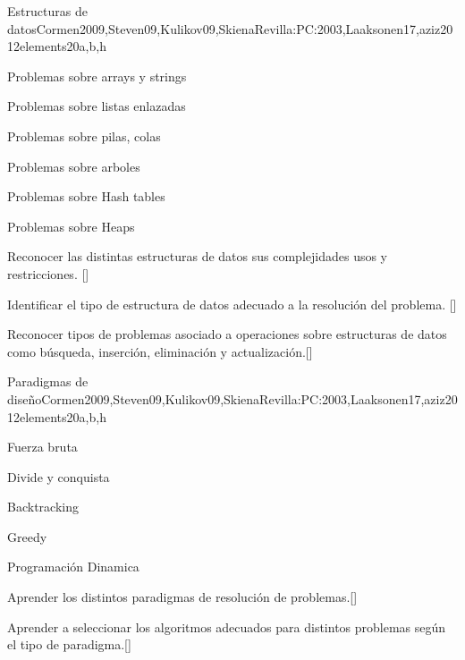 \begin{syllabus}
  \begin{unit}{Estructuras de datos}{}{Cormen2009,Steven09,Kulikov09,SkienaRevilla:PC:2003,Laaksonen17,aziz2012elements}{20}{a,b,h}
    \begin{topics}
      \item Problemas sobre arrays y strings
      \item Problemas sobre listas enlazadas
      \item Problemas sobre pilas, colas
      \item Problemas sobre arboles
      \item Problemas sobre Hash tables
      \item Problemas sobre Heaps 
    \end{topics}
    \begin{learningoutcomes}
        \item Reconocer las distintas estructuras de datos sus complejidades usos y restricciones. [\Usage]
        \item Identificar el tipo de estructura de datos adecuado a la resolución del problema. [\Usage]
        \item Reconocer tipos de problemas asociado a operaciones sobre estructuras de datos como búsqueda, inserción, eliminación y actualización.[\Usage]
    \end{learningoutcomes}
  \end{unit}
  
  \begin{unit}{Paradigmas de diseño}{}{Cormen2009,Steven09,Kulikov09,SkienaRevilla:PC:2003,Laaksonen17,aziz2012elements}{20}{a,b,h}
    \begin{topics}
      \item Fuerza bruta
      \item Divide y conquista
      \item Backtracking
      \item Greedy
      \item Programación Dinamica
    \end{topics}
    \begin{learningoutcomes}
        \item Aprender los distintos paradigmas de resolución de problemas.[\Usage]
        \item Aprender a seleccionar los algoritmos adecuados para distintos problemas según el tipo de paradigma.[\Usage]
    \end{learningoutcomes}
  \end{unit}
  

\end{syllabus}
